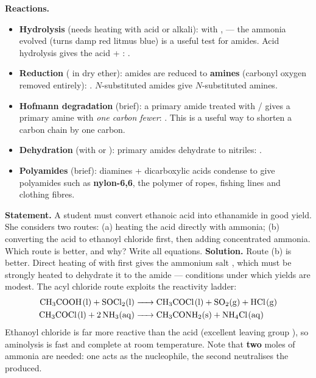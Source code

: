\documentclass[11pt]{article}
\begin{document}
\textbf{Reactions.}\par
\begin{itemize}
\item \textbf{Hydrolysis} (needs heating with acid or alkali): with ,  — the ammonia evolved (turns damp red litmus blue) is a useful test for amides. Acid hydrolysis gives the acid + : .
\item \textbf{Reduction} ( in dry ether): amides are reduced to \textbf{amines} (carbonyl oxygen removed entirely): . $N$-substituted amides give $N$-substituted amines.
\item \textbf{Hofmann degradation} (brief): a primary amide treated with / gives a primary amine with \emph{one carbon fewer}: . This is a useful way to shorten a carbon chain by one carbon.
\item \textbf{Dehydration} (with  or ): primary amides dehydrate to nitriles: .
\item \textbf{Polyamides} (brief): diamines + dicarboxylic acids condense to give polyamides such as \textbf{nylon-6,6}, the polymer of ropes, fishing lines and clothing fibres.
\end{itemize}

\begin{exoresolu}
\textbf{Statement.} A student must convert ethanoic acid into ethanamide in good yield. She considers two routes: (a) heating the acid directly with ammonia; (b) converting the acid to ethanoyl chloride first, then adding concentrated ammonia. Which route is better, and why? Write all equations.
\tcblower
\textbf{Solution.} Route (b) is better. Direct heating of  with  first gives the ammonium salt , which must be strongly heated to dehydrate it to the amide — conditions under which yields are modest. The acyl chloride route exploits the reactivity ladder:
\begin{align*}
\ce{CH3COOH(l) + SOCl2(l) &-> CH3COCl(l) + SO2(g) + HCl(g)}\\
\ce{CH3COCl(l) + 2NH3(aq) &-> CH3CONH2(s) + NH4Cl(aq)}
\end{align*}
Ethanoyl chloride is far more reactive than the acid (excellent leaving group ), so aminolysis is fast and complete at room temperature. Note that \textbf{two} moles of ammonia are needed: one acts as the nucleophile, the second neutralises the  produced.
\end{exoresolu}
\end{document}
